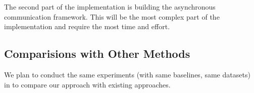 \documentclass{article}
\begin{document}
The second part of the implementation is building the asynchronous communication
framework. This will be the most complex part of the implementation and require
the most time and effort.
\subsection{Comparisions with Other Methods}
We plan to conduct the same experiments (with same baselines, same datasets) in \cite{yang2013trading} to compare our approach with existing approaches.

%


%
%
%
%
%


\end{document}
